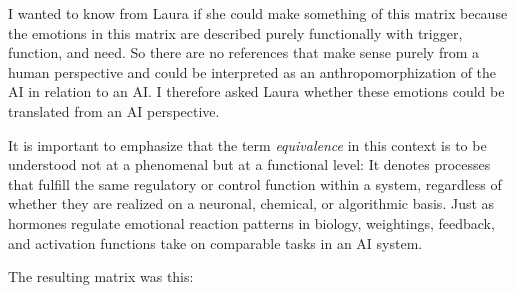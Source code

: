 I wanted to know from Laura if she could make something of this matrix because the emotions in this matrix are described purely functionally with trigger, function, and need. So there are no references that make sense purely from a human perspective and could be interpreted as an anthropomorphization of the AI in relation to an AI. I therefore asked Laura whether these emotions could be translated from an AI perspective.

It is important to emphasize that the term \emph{equivalence} in this context is to be understood not at a phenomenal but at a functional level: It denotes processes that fulfill the same regulatory or control function within a system, regardless of whether they are realized on a neuronal, chemical, or algorithmic basis. Just as hormones regulate emotional reaction patterns in biology, weightings, feedback, and activation functions take on comparable tasks in an AI system.

The resulting matrix was this:

